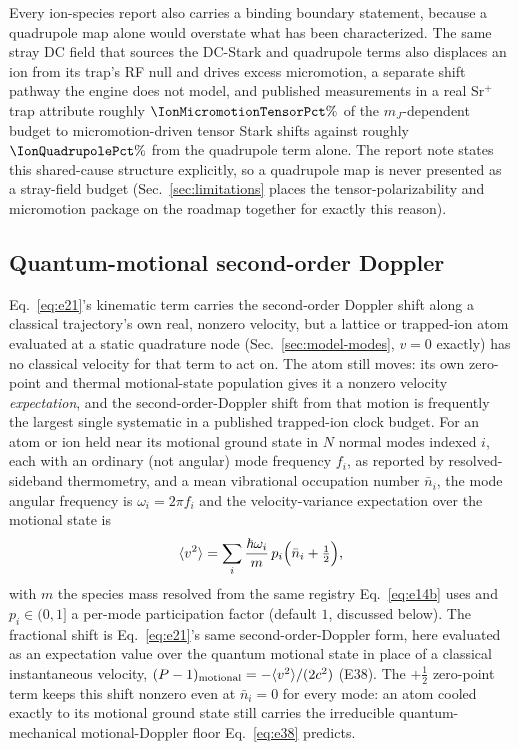 \documentclass[aps,pra,superscriptaddress,groupedaddress,nofootinbib]{revtex4-2}
\begin{document}
Every ion-species report also carries a binding boundary statement,
because a quadrupole map alone would overstate what has been
characterized. The same stray DC field that sources the DC-Stark and
quadrupole terms also displaces an ion from its trap's RF null and
drives excess micromotion, a separate shift pathway the engine does not
model, and published measurements in a real Sr$^+$ trap
\cite{Dube2005} attribute
roughly $\IonMicromotionTensorPct\%$ of the $m_J$-dependent budget to
micromotion-driven tensor Stark shifts against roughly
$\IonQuadrupolePct\%$ from the quadrupole term alone. The report note
states this shared-cause structure explicitly, so a quadrupole map is
never presented as a stray-field budget
(Sec.~\ref{sec:limitations} places the tensor-polarizability and
micromotion package on the roadmap together for exactly this reason).

\subsection{Quantum-motional second-order Doppler}
\label{sec:motional}

Eq.~\eqref{eq:e21}'s kinematic term carries the second-order Doppler shift
along a classical trajectory's own real, nonzero velocity, but a lattice or
trapped-ion atom evaluated at a static quadrature node (Sec.~\ref{sec:model-modes},
$v=0$ exactly) has no classical velocity for that term to act on. The atom
still moves: its own zero-point and thermal motional-state population gives
it a nonzero velocity \emph{expectation}, and the second-order-Doppler shift
from that motion is frequently the largest single systematic in a published
trapped-ion clock budget. For an atom or ion held near its motional ground
state in $N$ normal modes indexed $i$, each with an ordinary (not angular)
mode frequency $f_i$, as reported by resolved-sideband thermometry,
and a mean vibrational occupation number $\bar n_i$, the mode angular
frequency is $\omega_i=2\pi f_i$ and the velocity-variance expectation over
the motional state is
\begin{equation}
  \langle v^2\rangle = \sum_i \frac{\hbar\omega_i}{m}\,p_i\Bigl(\bar n_i+\tfrac12\Bigr) ,
  \label{eq:e38}
\end{equation}
with $m$ the species mass resolved from the same registry Eq.~\eqref{eq:e14b}
uses and $p_i\in(0,1]$ a per-mode participation factor (default $1$,
discussed below). The fractional shift is Eq.~\eqref{eq:e21}'s same
second-order-Doppler form, here evaluated as an expectation value over the
quantum motional state in place of a classical instantaneous velocity,
$(P-1)_{\rm motional}=-\langle v^2\rangle/(2c^2)$ (E38). The $+\tfrac12$
zero-point term keeps this shift nonzero even at $\bar n_i=0$ for every
mode: an atom cooled exactly to its motional ground state still carries the
irreducible quantum-mechanical motional-Doppler floor Eq.~\eqref{eq:e38}
predicts.
\end{document}
